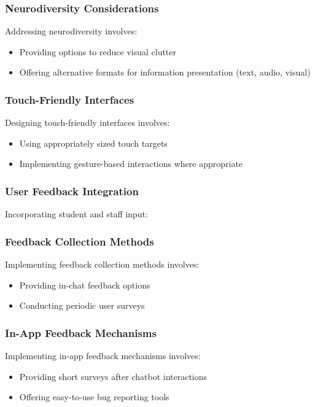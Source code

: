 \documentclass[14pt,a4paper]{article}
\begin{document}
\begin{multicols}{2}
\subsubsection*{Neurodiversity Considerations}
Addressing neurodiversity \textit{\parencite[pp. 30-60]{Armstrong2023}} involves:
\begin{itemize}
    \item Providing options to reduce visual clutter
    \item Offering alternative formats for information presentation (text, audio, visual)
\end{itemize}

\subsubsection*{Touch-Friendly Interfaces}
Designing touch-friendly interfaces \textit{\parencite[pp. 80-120]{HooberBerkman2023}} involves:
\begin{itemize}
    \item Using appropriately sized touch targets
    \item Implementing gesture-based interactions where appropriate
\end{itemize}


\subsubsection{User Feedback Integration}
Incorporating student and staff input:

\subsubsection*{Feedback Collection Methods}
Implementing feedback collection methods \textit{\parencite[pp. 100-50]{TullisAlbert2024}} involves:
\begin{itemize}
    \item Providing in-chat feedback options
    \item Conducting periodic user surveys
\end{itemize}

\subsubsection*{In-App Feedback Mechanisms}
Implementing in-app feedback mechanisms \textit{\parencite[pp. 100-150]{TullisAlbert2024}} involves:
\begin{itemize}
    \item Providing short surveys after chatbot interactions
    \item Offering easy-to-use bug reporting tools
\end{itemize}


\end{multicols}
\end{document}

